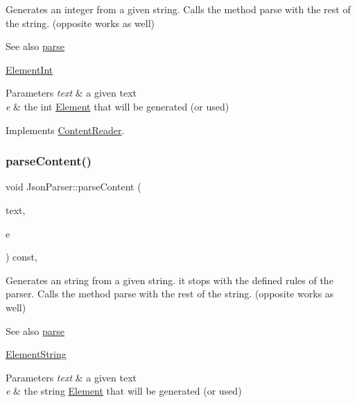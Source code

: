 Generates an integer from a given string. Calls the method parse with the rest of the string. (opposite works as well) \begin{DoxySeeAlso}{See also}
\mbox{\hyperlink{classJsonParser_a3ec3a9fcc8a63f987b4749d60b0568df}{parse}} 

\mbox{\hyperlink{classElementInt}{Element\+Int}}
\end{DoxySeeAlso}

\begin{DoxyParams}{Parameters}
{\em text} & a given text \\
\hline
{\em e} & the int \mbox{\hyperlink{classElement}{Element}} that will be generated (or used) \\
\hline
\end{DoxyParams}


Implements \mbox{\hyperlink{classContentReader_a7eef37b8b9761e21c0a3907ff94c72f7}{Content\+Reader}}.

\mbox{\label{classJsonParser_a94737a7518f05e4ed43a753f4148b354}} 
\subsubsection{\texorpdfstring{parse\+Content()}{parseContent()}\hspace{0.1cm}{\footnotesize\ttfamily [2/6]}}
{\footnotesize\ttfamily void Json\+Parser\+::parse\+Content (\begin{DoxyParamCaption}\item[{std\+::string \&}]{text,  }\item[{\mbox{\hyperlink{classElementString}{Element\+String}} $\ast$}]{e }\end{DoxyParamCaption}) const\hspace{0.3cm}{\ttfamily [override]}, {\ttfamily [virtual]}}

Generates an string from a given string. it stops with the defined rules of the parser. Calls the method parse with the rest of the string. (opposite works as well) \begin{DoxySeeAlso}{See also}
\mbox{\hyperlink{classJsonParser_a3ec3a9fcc8a63f987b4749d60b0568df}{parse}} 

\mbox{\hyperlink{classElementString}{Element\+String}}
\end{DoxySeeAlso}

\begin{DoxyParams}{Parameters}
{\em text} & a given text \\
\hline
{\em e} & the string \mbox{\hyperlink{classElement}{Element}} that will be generated (or used) \\
\hline
\end{DoxyParams}


